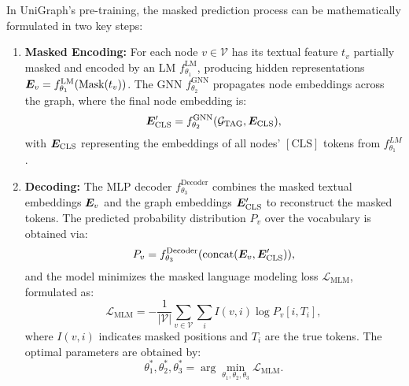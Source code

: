 In UniGraph's pre-training, the masked prediction process can be mathematically formulated in two key steps:
\begin{enumerate}[leftmargin=*,itemsep=0pt,parsep=0.2em,topsep=0.3em,partopsep=0.3em]
    \item \textbf{Masked Encoding:} For each node \( v \in \mathcal{V} \) has its textual feature \( t_v \) partially masked and encoded by an LM \( f_{\theta_1}^{\text{LM}} \), producing hidden representations \( {\bm{E}}_v = f_{\theta_1}^{\text{LM}}(\text{Mask}(t_v)) \). The GNN \( f_{\theta_2}^{\text{GNN}} \) propagates node embeddings across the graph, where the final node embedding is:
    \begin{equation}
        {\bm{E}}_{\text{CLS}}' = f_{\theta_2}^{\text{GNN}}(\mathcal{G}_{\text{TAG}}, {\bm{E}}_{\text{CLS}}),
    \end{equation}
    with \( {\bm{E}}_{\text{CLS}} \) representing the embeddings of all nodes' \([\text{CLS}]\) tokens from \( f_{\theta_1}^{LM} \).
    
    \item \textbf{Decoding:} The MLP decoder \( f_{\theta_3}^{\text{Decoder}} \) combines the masked textual embeddings \( {\bm{E}}_v \) and the graph embeddings \( {\bm{E}}_{\text{CLS}}' \) to reconstruct the masked tokens. The predicted probability distribution \( P_v \) over the vocabulary is obtained via:
    \begin{equation}
        P_v = f_{\theta_3}^{\text{Decoder}}(\text{concat}({\bm{E}}_v, {\bm{E}}_{\text{CLS}}')),
    \end{equation}
and the model minimizes the masked language modeling loss \( \mathcal{L}_\text{{MLM}} \), formulated as:
\begin{equation}
    \mathcal{L}_\text{{MLM}} = -\frac{1}{|\mathcal{V}|} \sum_{v \in \mathcal{V}} \sum_{i} I(v, i) \log P_v[i, T_i],
\end{equation}
where \( I(v, i) \) indicates masked positions and \( T_i \) are the true tokens. The optimal parameters are obtained by:
\begin{equation}
    \theta_1^*, \theta_2^*, \theta_3^* = \arg\min_{\theta_1, \theta_2, \theta_3} \mathcal{L}_\text{{MLM}}.
\end{equation}
\end{enumerate}



